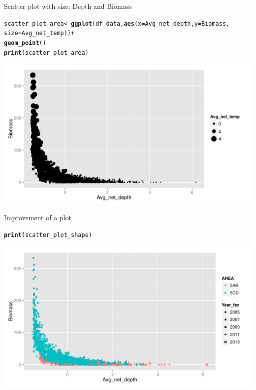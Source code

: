 \documentclass{beamer}\usepackage[]{graphicx}\usepackage[]{color}
\makeatletter
\newcommand{\hlopt}[1]{\textcolor[rgb]{0,0,0}{#1}}%
\newcommand{\hlstd}[1]{\textcolor[rgb]{0.345,0.345,0.345}{#1}}%
\newcommand{\hlkwb}[1]{\textcolor[rgb]{0.69,0.353,0.396}{#1}}%
\newcommand{\hlkwc}[1]{\textcolor[rgb]{0.333,0.667,0.333}{#1}}%
\newcommand{\hlkwd}[1]{\textcolor[rgb]{0.737,0.353,0.396}{\textbf{#1}}}%
\newenvironment{kframe}{%
 \def\at@end@of@kframe{}%
 \ifinner\ifhmode%
  \def\at@end@of@kframe{\end{minipage}}%
  \begin{minipage}{\columnwidth}%
 \fi\fi%
 \def\FrameCommand##1{\hskip\@totalleftmargin \hskip-\fboxsep
 \colorbox{shadecolor}{##1}\hskip-\fboxsep
     \hskip-\linewidth \hskip-\@totalleftmargin \hskip\columnwidth}%
 \MakeFramed {\advance\hsize-\width
   \@totalleftmargin\z@ \linewidth\hsize
   \@setminipage}}%
 {\par\unskip\endMakeFramed%
 \at@end@of@kframe}
\newenvironment{knitrout}{}{} %
\makeatother
\begin{document}
\begin{frame}[fragile]{Scatter plot with size: Depth and Biomass}
\begin{knitrout}\footnotesize
{}\color{fgcolor}\begin{kframe}
\begin{alltt}
  \hlstd{scatter_plot_area} \hlkwb{<-} \hlkwd{ggplot}\hlstd{(df_data,} \hlkwd{aes}\hlstd{(}\hlkwc{x}\hlstd{=Avg_net_depth,} \hlkwc{y}\hlstd{=Biomass,}
                                         \hlkwc{size}\hlstd{=Avg_net_temp))} \hlopt{+}
  \hlkwd{geom_point}\hlstd{()}
  \hlkwd{print}\hlstd{(scatter_plot_area)}
\end{alltt}
\end{kframe}

{\centering \includegraphics[width=.9\linewidth]{figure/scatter_plot_color_size-1} 

}



\end{knitrout}
\end{frame}

\begin{frame}[fragile]{Improvement of a plot}
\begin{knitrout}\footnotesize
{}\color{fgcolor}\begin{kframe}
\begin{alltt}
  \hlkwd{print}\hlstd{(scatter_plot_shape)}
\end{alltt}
\end{kframe}

{\centering \includegraphics[width=.9\linewidth]{figure/scatter_plot_shape2-1} 

}



\end{knitrout}
\end{frame}
\end{document}

